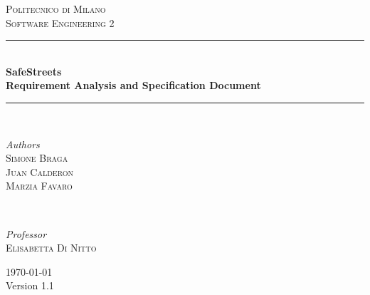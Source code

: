 \documentclass[a4paper]{article}
\begin{document}

\begin{titlepage}
	\newcommand{\HRule}{\rule{\linewidth}{0.5mm}}
	
	\center
	
	
	\textsc{\LARGE Politecnico di Milano}\\[1.5cm]
	
	\textsc{\Large Software Engineering 2}\\[0.5cm]
	
	
	\HRule\\[0.4cm]
	
	{\huge\bfseries SafeStreets\medskip\\
	\normalsize Requirement Analysis and Specification Document}\\[0.4cm]
	
	\HRule\\[1.5cm]
	
	
	\begin{minipage}{0.4\textwidth}
		\begin{flushleft}
			\large
			\textit{Authors}\\
			\textsc{Simone Braga}\\
			\textsc{Juan Calderon}\\
			\textsc{Marzia Favaro}
		\end{flushleft}
	\end{minipage}
	~
	\begin{minipage}{0.4\textwidth}
		\begin{flushright}
			\large
			\textit{Professor}\\
			\textsc{Elisabetta Di Nitto}\linebreak\linebreak
		\end{flushright}
	\end{minipage}
	
	
	\vfill\vfill\vfill
	
	{\large\today\\ Version 1.1}
	
	
	\vfill
	
\end{titlepage}
\end{document}
